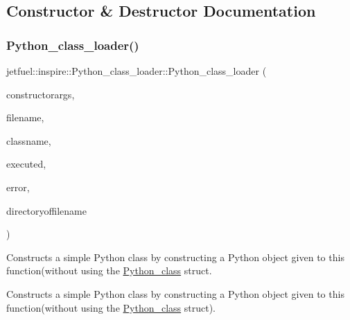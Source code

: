 \subsection{Constructor \& Destructor Documentation}
\mbox{\label{classjetfuel_1_1inspire_1_1Python__class__loader_ae8e3d2e3e2b95a5463f5735f2c0f6be2}} 
\subsubsection{\texorpdfstring{Python\+\_\+class\+\_\+loader()}{Python\_class\_loader()}\hspace{0.1cm}{\footnotesize\ttfamily [1/2]}}
{\footnotesize\ttfamily jetfuel\+::inspire\+::\+Python\+\_\+class\+\_\+loader\+::\+Python\+\_\+class\+\_\+loader (\begin{DoxyParamCaption}\item[{Py\+Object $\ast$}]{constructorargs,  }\item[{std\+::string $\ast$}]{filename,  }\item[{std\+::string $\ast$}]{classname,  }\item[{bool $\ast$}]{executed,  }\item[{std\+::string $\ast$}]{error,  }\item[{std\+::string $\ast$}]{directoryoffilename }\end{DoxyParamCaption})}



Constructs a simple Python class by constructing a Python object given to this function(without using the \hyperlink{structjetfuel_1_1inspire_1_1Python__class}{Python\+\_\+class} struct. 

Constructs a simple Python class by constructing a Python object given to this function(without using the \hyperlink{structjetfuel_1_1inspire_1_1Python__class}{Python\+\_\+class} struct).


